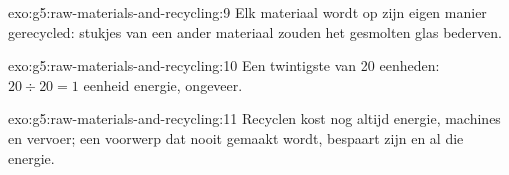 \begin{solution}{exo:g5:raw-materials-and-recycling:9}
Elk materiaal wordt op zijn eigen manier gerecycled: stukjes van een
ander materiaal zouden het gesmolten glas bederven.
\end{solution}

\begin{solution}{exo:g5:raw-materials-and-recycling:10}
Een twintigste van 20 eenheden: $20 \div 20 = 1$ eenheid energie,
ongeveer.
\end{solution}

\begin{solution}{exo:g5:raw-materials-and-recycling:11}
Recyclen kost nog altijd energie, machines en vervoer; een voorwerp dat
nooit gemaakt wordt, bespaart zijn  en al die energie.
\end{solution}
